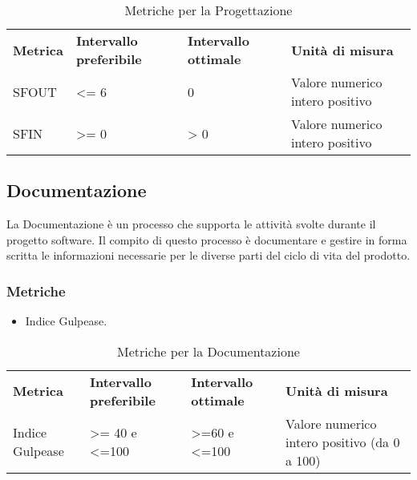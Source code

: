 \renewcommand{\arraystretch}{2.2}
\begin{longtable}{|C{4.5cm}|C{2.25cm}|C{2.25cm}|C{3cm}|}

	\caption{Metriche per la Progettazione}\\
	\hline

	\textbf{Metrica} & \textbf{Intervallo preferibile}  & \textbf{Intervallo ottimale} & \textbf{Unità di misura}
	\tabularnewline
	\endfirsthead

	SFOUT & <= 6  & 0 & Valore numerico intero positivo \\
	SFIN &  >= 0 & > 0 & Valore numerico intero positivo \\
\end{longtable}




\subsection{Documentazione}
La Documentazione è un processo che supporta le attività svolte durante
il progetto software.
Il compito di questo processo è documentare e
gestire in forma scritta le informazioni necessarie per le diverse parti del
ciclo di vita del prodotto.
\subsubsection{Metriche}
\begin{itemize}
	\item Indice Gulpease.
\end{itemize}

\renewcommand{\arraystretch}{2.2}
\begin{longtable}{|C{2.5cm}|C{3.25cm}|C{3.25cm}|C{3cm}|}

	\caption{Metriche per la Documentazione}\\
	\hline

	\textbf{Metrica} & \textbf{Intervallo preferibile}  & \textbf{Intervallo ottimale} & \textbf{Unità di misura}
	\tabularnewline
	\endfirsthead

	Indice Gulpease & >= 40 e <=100  & >=60 e <=100 & Valore numerico intero positivo (da 0 a 100) \\

\end{longtable}




